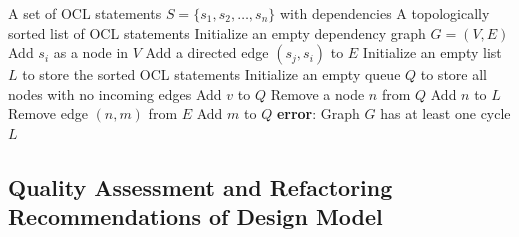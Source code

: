 \documentclass[pdflatex,sn-mathphys-num]{sn-jnl}%
\theoremstyle{thmstyleone}%
\theoremstyle{thmstyletwo}%
\theoremstyle{thmstylethree}%
\begin{document}

\begin{algorithm}[H]
\caption{OCL Statement Execution Order Sorting}
\label{algB}
\begin{algorithmic}[1]
\REQUIRE A set of OCL statements $S = \{s_1, s_2, \ldots, s_n\}$ with dependencies
\ENSURE A topologically sorted list of OCL statements
\STATE Initialize an empty dependency graph $G = (V, E)$
    \STATE Add $s_i$ as a node in $V$
\ENDFOR
{}
        \STATE Add a directed edge $(s_j, s_i)$ to $E$
    \ENDFOR
\ENDFOR
\STATE Initialize an empty list $L$ to store the sorted OCL statements
\STATE Initialize an empty queue $Q$ to store all nodes with no incoming edges
        \STATE Add $v$ to $Q$
    \ENDIF
\ENDFOR
{}
    \STATE Remove a node $n$ from $Q$
    \STATE Add $n$ to $L$
        \STATE Remove edge $(n, m)$ from $E$
            \STATE Add $m$ to $Q$
        \ENDIF
    \ENDFOR
\ENDWHILE
{}
    \STATE \textbf{error}: Graph $G$ has at least one cycle
\ENDIF
\RETURN $L$
\end{algorithmic}
\end{algorithm}


\subsection{Quality Assessment and Refactoring Recommendations of Design Model}
\end{document}
